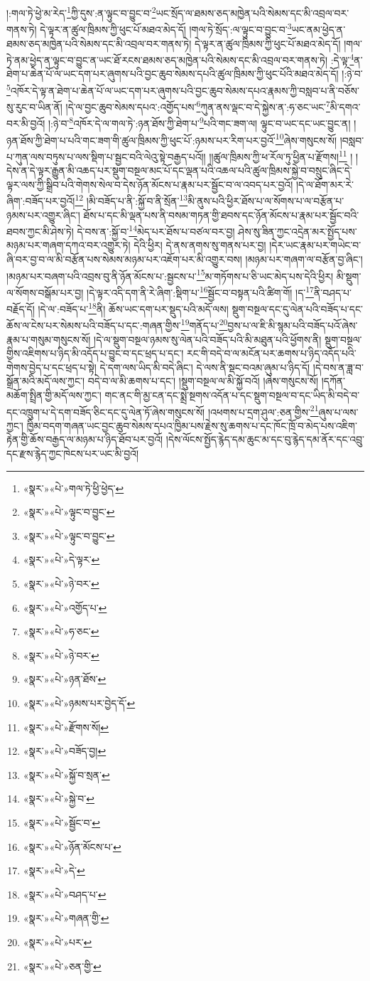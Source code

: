 །:གལ་ཏེ་ཕྱེ་མ་རེད་\footnote{«སྣར་»«པེ་»གལ་ཏེ་ཕྱི་ཕྱེད་}ཀྱི་དུས་:ན་ལྟུང་བ་བྱུང་བ་\footnote{«སྣར་»«པེ་»ལྟུང་བ་བྱུང་}ཡང་སྲོད་ལ་ཐམས་ཅད་མཁྱེན་པའི་སེམས་དང་མི་འབྲལ་བར་གནས་ཏེ། དེ་ལྟར་ན་ཚུལ་ཁྲིམས་ཀྱི་ཕུང་པོ་མཐའ་མེད་དོ། །གལ་ཏེ་སྲོད་:ལ་ལྟུང་བ་བྱུང་བ་\footnote{«སྣར་»«པེ་»ལྟུང་བ་བྱུང་}ཡང་ནམ་ཕྱེད་ན་ཐམས་ཅད་མཁྱེན་པའི་སེམས་དང་མི་འབྲལ་བར་གནས་ཏེ། དེ་ལྟར་ན་ཚུལ་ཁྲིམས་ཀྱི་ཕུང་པོ་མཐའ་མེད་དོ། །གལ་ཏེ་ནམ་ཕྱེད་ན་ལྟུང་བ་བྱུང་ན་ཡང་ཐོ་རངས་ཐམས་ཅད་མཁྱེན་པའི་སེམས་དང་མི་འབྲལ་བར་གནས་ཏེ། :དེ་ལྟ་\footnote{«སྣར་»«པེ་»དེ་ལྟར་}ན་ཐེག་པ་ཆེན་པོ་ལ་ཡང་དག་པར་ཞུགས་པའི་བྱང་ཆུབ་སེམས་དཔའི་ཚུལ་ཁྲིམས་ཀྱི་ཕུང་པོའི་མཐའ་མེད་དོ། །:ཉེ་བ་\footnote{«སྣར་»«པེ་»ཉེ་བར་}འཁོར་དེ་ལྟ་ན་ཐེག་པ་ཆེན་པོ་ལ་ཡང་དག་པར་ཞུགས་པའི་བྱང་ཆུབ་སེམས་དཔའ་རྣམས་ཀྱི་བསླབ་པ་ནི་བཅོས་སུ་རུང་བ་ཡིན་ནོ། །དེ་ལ་བྱང་ཆུབ་སེམས་དཔའ་:འགྱོད་པས་\footnote{«སྣར་»«པེ་»འགྱོད་པ་}ཀུན་ནས་ལྡང་བ་དེ་སྐྱེས་ན་:ཧ་ཅང་ཡང་\footnote{«སྣར་»«པེ་»ཧ་ཅང་}མི་དགའ་བར་མི་བྱའོ། །:ཉེ་བ་\footnote{«སྣར་»«པེ་»ཉེ་བར་}འཁོར་དེ་ལ་གལ་ཏེ་:ཉན་ཐོས་ཀྱི་ཐེག་པ་\footnote{«སྣར་»«པེ་»ཉན་ཐོས་}པའི་གང་ཟག་ལ། ལྟུང་བ་ཡང་དང་ཡང་བྱུང་ན། །ཉན་ཐོས་ཀྱི་ཐེག་པ་པའི་གང་ཟག་གི་ཚུལ་ཁྲིམས་ཀྱི་ཕུང་པོ་:ཉམས་པར་རིག་པར་བྱའོ་\footnote{«སྣར་»«པེ་»ཉམས་པར་བྱེད་དོ་}ཞེས་གསུངས་སོ། །བསླབ་པ་ཀུན་ལས་བཏུས་པ་ལས་སྡིག་པ་སྦྱང་བའི་ལེའུ་སྟེ་བརྒྱད་པའོ།། །།ཚུལ་ཁྲིམས་ཀྱི་ཕ་རོལ་ཏུ་ཕྱིན་པ་རྫོགས།\footnote{«སྣར་»«པེ་»རྫོགས་སོ།} ། །དེས་ན་དེ་ལྟར་རྒྱུན་མི་འཆད་པར་སྡུག་བསྔལ་མང་པོ་དང་ལྡན་པའི་འཆལ་པའི་ཚུལ་ཁྲིམས་སྐྱེ་བ་བསྲུང་ཞིང་དེ་ལྟར་ལས་ཀྱི་སྒྲིབ་པའི་གེགས་སེལ་བ་དེས་ཉོན་མོངས་པ་རྣམ་པར་སྦྱོང་བ་ལ་འབད་པར་བྱའོ། །དེ་ལ་ཐོག་མར་རེ་ཞིག་:བཟོད་པར་བྱའོ།\footnote{«སྣར་»«པེ་»བཟོད་བྱ།} །མི་བཟོད་པ་ནི་:སྐྱོ་བ་ནི་སྲོན་\footnote{«སྣར་»«པེ་»སྐྱོ་བ་སྲན་}མི་ནུས་པའི་ཕྱིར་ཐོས་པ་ལ་སོགས་པ་ལ་བརྩོན་པ་ཉམས་པར་འགྱུར་ཞིང་། ཐོས་པ་དང་མི་ལྡན་པས་ནི་བསམ་གཏན་གྱི་ཐབས་དང་ཉོན་མོངས་པ་རྣམ་པར་སྦྱོང་བའི་ཐབས་ཀྱང་མི་ཤེས་ཏེ། དེ་བས་ན་:སྐྱོ་བ་\footnote{«སྣར་»«པེ་»སྐྱེ་བ་}མེད་པར་ཐོས་པ་བཙལ་བར་བྱ། ཤེས་སུ་ཟིན་ཀྱང་འདྲེན་མར་སྤྱོད་པས་མཉམ་པར་གཞག་དཀའ་བར་འགྱུར་ཏེ། དེའི་ཕྱིར། དེ་ནས་ནགས་སུ་གནས་པར་བྱ། །དེར་ཡང་རྣམ་པར་གཡེང་བ་ཞི་བར་བྱ་བ་ལ་མི་བརྩོན་པས་སེམས་མཉམ་པར་འཇོག་པར་མི་འགྱུར་བས། །མཉམ་པར་གཞག་ལ་བརྩོན་བྱ་ཞིང་། །མཉམ་པར་བཞག་པའི་འབྲས་བུ་ནི་ཉོན་མོངས་པ་:སྦྱངས་པ་\footnote{«སྣར་»«པེ་»སྦྱོང་བ་}མ་གཏོགས་པ་ཅི་ཡང་མེད་པས་དེའི་ཕྱིར། མི་སྡུག་ལ་སོགས་བསྒོམ་པར་བྱ། །དེ་ལྟར་འདི་དག་ནི་རེ་ཞིག་:སྡིག་པ་\footnote{«སྣར་»«པེ་»ཉོན་མོངས་པ་}སྦྱོང་བ་བསྟན་པའི་ཚིག་གོ། །ད་\footnote{«སྣར་»«པེ་»དེ་}ནི་བཤད་པ་བརྗོད་དོ། །དེ་ལ་:བཟོད་པ་\footnote{«སྣར་»«པེ་»བཤད་པ་}ནི། ཆོས་ཡང་དག་པར་སྡུད་པའི་མདོ་ལས། སྡུག་བསྔལ་དང་དུ་ལེན་པའི་བཟོད་པ་དང་ཆོས་ལ་ངེས་པར་སེམས་པའི་བཟོད་པ་དང་:གཞན་གྱིས་\footnote{«སྣར་»«པེ་»གཞན་གྱི་}གནོད་པ་\footnote{«སྣར་»«པེ་»པར་}བྱས་པ་ལ་ཇི་མི་སྙམ་པའི་བཟོད་པའོ་ཞེས་རྣམ་པ་གསུམ་གསུངས་སོ། །དེ་ལ་སྡུག་བསྔལ་ཉམས་སུ་ལེན་པའི་བཟོད་པའི་མི་མཐུན་པའི་ཕྱོགས་ནི། སྡུག་བསྔལ་གྱིས་འཇིགས་པ་ཉིད་མི་འདོད་པ་བྱུང་བ་དང་ཕྲད་པ་དང་། རང་གི་བདེ་བ་ལ་མངོན་པར་ཆགས་པ་ཉིད་འདོད་པའི་གེགས་བྱེད་པ་དང་ཕྲད་པ་སྟེ། དེ་དག་ལས་ཡིད་མི་བདེ་ཞིང་། དེ་ལས་ནི་སྡང་བའམ་ཞུམ་པ་ཉིད་དོ། །དེ་བས་ན་ཟླ་བ་སྒྲོན་མའི་མདོ་ལས་ཀྱང་། བདེ་བ་ལ་མི་ཆགས་པ་དང་། །སྡུག་བསྔལ་ལ་མི་སྐྱོ་བའོ། །ཞེས་གསུངས་སོ། །དཀོན་མཆོག་སྤྲིན་གྱི་མདོ་ལས་ཀྱང་། གང་ནང་གི་མྱ་ངན་དང་སྨྲེ་སྔགས་འདོན་པ་དང་སྡུག་བསྔལ་བ་དང་ཡིད་མི་བདེ་བ་དང་འཁྲུག་པ་དེ་དག་བཟོད་ཅིང་དང་དུ་ལེན་ཏོ་ཞེས་གསུངས་སོ། །འཕགས་པ་དྲག་ཤུལ་:ཅན་གྱིས་\footnote{«སྣར་»«པེ་»ཅན་གྱི་}ཞུས་པ་ལས་ཀྱང་། ཁྱིམ་བདག་གཞན་ཡང་བྱང་ཆུབ་སེམས་དཔའ་ཁྱིམ་པས་རྗེས་སུ་ཆགས་པ་དང་ཁོང་ཁྲོ་བ་མེད་པས་འཇིག་རྟེན་གྱི་ཆོས་བརྒྱད་ལ་མཉམ་པ་ཉིད་ཐོབ་པར་བྱའོ། །དེས་ལོངས་སྤྱོད་རྙེད་དམ་ཆུང་མ་དང་བུ་རྙེད་དམ་ནོར་དང་འབྲུ་དང་རྫས་རྙེད་ཀྱང་ཁེངས་པར་ཡང་མི་བྱའོ། 
